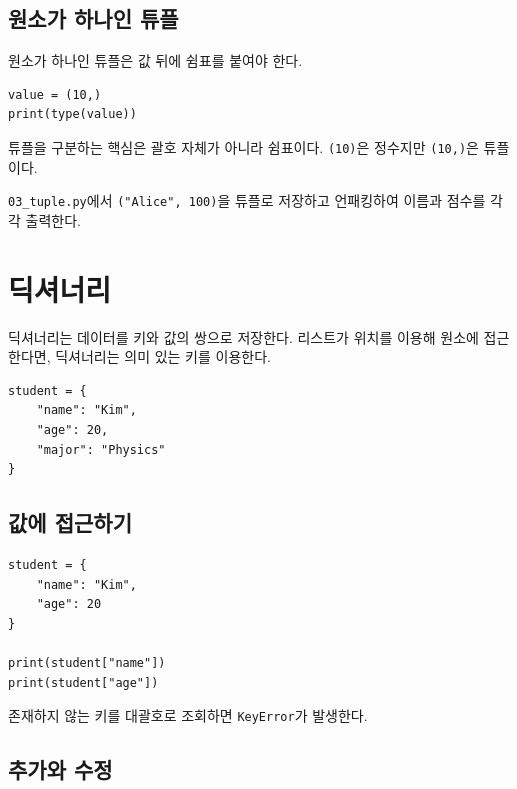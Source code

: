 \documentclass[11pt,a4paper]{article}
\begin{document}
\subsection{원소가 하나인 튜플}

원소가 하나인 튜플은 값 뒤에 쉼표를 붙여야 한다.

\begin{lstlisting}
value = (10,)
print(type(value))
\end{lstlisting}

\begin{importantbox}
튜플을 구분하는 핵심은 괄호 자체가 아니라 쉼표이다. \texttt{(10)}은 정수지만 \texttt{(10,)}은 튜플이다.
\end{importantbox}

\begin{practicebox}
\texttt{03\_tuple.py}에서 \texttt{("Alice", 100)}을 튜플로 저장하고 언패킹하여 이름과 점수를 각각 출력한다.
\end{practicebox}

\section{딕셔너리}

딕셔너리는 데이터를 키와 값의 쌍으로 저장한다. 리스트가 위치를 이용해 원소에 접근한다면, 딕셔너리는 의미 있는 키를 이용한다.

\begin{lstlisting}
student = {
    "name": "Kim",
    "age": 20,
    "major": "Physics"
}
\end{lstlisting}

\subsection{값에 접근하기}

\begin{lstlisting}
student = {
    "name": "Kim",
    "age": 20
}

print(student["name"])
print(student["age"])
\end{lstlisting}

존재하지 않는 키를 대괄호로 조회하면 \texttt{KeyError}가 발생한다.

\subsection{추가와 수정}
\end{document}
